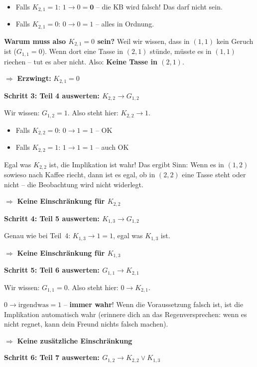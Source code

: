 \documentclass[a4paper,12pt]{article}
\begin{document}
\begin{itemize}
\item Falls $K_{2,1} = 1$: $1 \to 0 = \mathbf{0}$ -- die KB wird falsch! Das darf nicht sein.
\item Falls $K_{2,1} = 0$: $0 \to 0 = 1$ -- alles in Ordnung.
\end{itemize}

\textbf{Warum muss also $K_{2,1} = 0$ sein?} Weil wir wissen, dass in $(1{,}1)$ kein Geruch ist ($G_{1,1}=0$). Wenn dort eine Tasse in $(2{,}1)$ st\"unde, m\"usste es in $(1{,}1)$ riechen -- tut es aber nicht. Also: \textbf{Keine Tasse in $(2{,}1)$}.

$\Rightarrow$ \textbf{Erzwingt:} $K_{2,1} = 0$

\bigskip
\textbf{Schritt 3: Teil 4 auswerten: $K_{2,2} \to G_{1,2}$}

Wir wissen: $G_{1,2} = 1$. Also steht hier: $K_{2,2} \to 1$.

\begin{itemize}
\item Falls $K_{2,2} = 0$: $0 \to 1 = 1$ -- OK
\item Falls $K_{2,2} = 1$: $1 \to 1 = 1$ -- auch OK
\end{itemize}

Egal was $K_{2,2}$ ist, die Implikation ist wahr! Das ergibt Sinn: Wenn es in $(1{,}2)$ sowieso nach Kaffee riecht, dann ist es egal, ob in $(2{,}2)$ eine Tasse steht oder nicht -- die Beobachtung wird nicht widerlegt.

$\Rightarrow$ \textbf{Keine Einschr\"ankung f\"ur $K_{2,2}$}

\bigskip
\textbf{Schritt 4: Teil 5 auswerten: $K_{1,3} \to G_{1,2}$}

Genau wie bei Teil~4: $K_{1,3} \to 1 = 1$, egal was $K_{1,3}$ ist.

$\Rightarrow$ \textbf{Keine Einschr\"ankung f\"ur $K_{1,3}$}

\bigskip
\textbf{Schritt 5: Teil 6 auswerten: $G_{1,1} \to K_{2,1}$}

Wir wissen: $G_{1,1} = 0$. Also steht hier: $0 \to K_{2,1}$.

$0 \to \text{irgendwas} = 1$ -- \textbf{immer wahr}! Wenn die Voraussetzung falsch ist, ist die Implikation automatisch wahr (erinnere dich an das Regenversprechen: wenn es nicht regnet, kann dein Freund nichts falsch machen).

$\Rightarrow$ \textbf{Keine zus\"atzliche Einschr\"ankung}

\bigskip
\textbf{Schritt 6: Teil 7 auswerten: $G_{1,2} \to K_{2,2} \vee K_{1,3}$}
\end{document}
